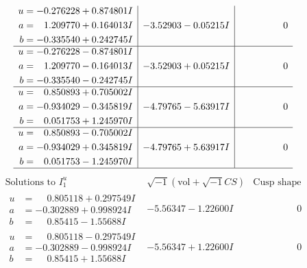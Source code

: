 \documentclass[1p]{elsarticle_modified}
\theoremstyle{definition}
\newcommand{\I}{\sqrt{-1}}
\begin{document}
$$\begin{array}{c|c|c}
\begin{aligned}
u &= -0.276228 + 0.874801 I \\
a &= \phantom{-}1.209770 + 0.164013 I \\
b &= -0.335540 + 0.242745 I\end{aligned}
 & -3.52903 - 0.05215 I & \phantom{-0.000000 } 0 \\ \hline\begin{aligned}
u &= -0.276228 - 0.874801 I \\
a &= \phantom{-}1.209770 - 0.164013 I \\
b &= -0.335540 - 0.242745 I\end{aligned}
 & -3.52903 + 0.05215 I & \phantom{-0.000000 } 0 \\ \hline\begin{aligned}
u &= \phantom{-}0.850893 + 0.705002 I \\
a &= -0.934029 - 0.345819 I \\
b &= \phantom{-}0.051753 + 1.245970 I\end{aligned}
 & -4.79765 - 5.63917 I & \phantom{-0.000000 } 0 \\ \hline\begin{aligned}
u &= \phantom{-}0.850893 - 0.705002 I \\
a &= -0.934029 + 0.345819 I \\
b &= \phantom{-}0.051753 - 1.245970 I\end{aligned}
 & -4.79765 + 5.63917 I & \phantom{-0.000000 } 0\\
 \hline 
 \end{array}$$\newpage$$\begin{array}{c|c|c}  
\text{Solutions to }I^u_{1}& \I (\text{vol} + \sqrt{-1}CS) & \text{Cusp shape}\\
 \hline 
\begin{aligned}
u &= \phantom{-}0.805118 + 0.297549 I \\
a &= -0.302889 + 0.998924 I \\
b &= \phantom{-}0.85415 - 1.55688 I\end{aligned}
 & -5.56347 - 1.22600 I & \phantom{-0.000000 } 0 \\ \hline\begin{aligned}
u &= \phantom{-}0.805118 - 0.297549 I \\
a &= -0.302889 - 0.998924 I \\
b &= \phantom{-}0.85415 + 1.55688 I\end{aligned}
 & -5.56347 + 1.22600 I & \phantom{-0.000000 } 0 \\ \hline\begin{aligned}

\end{aligned}
\end{array}$$
\end{document}
